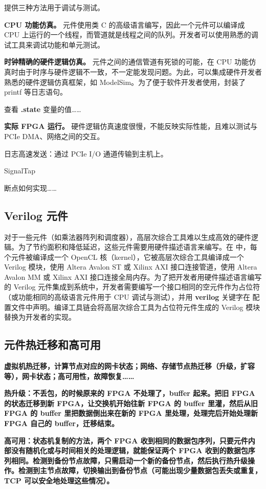 \name 提供三种方法用于调试与测试。

\textbf{CPU 功能仿真。}
\name 元件使用类 C 的高级语言编写，因此一个元件可以编译成 CPU 上运行的一个线程，而管道就是线程之间的队列。开发者可以使用熟悉的调试工具来调试功能和单元测试。

\textbf{时钟精确的硬件逻辑仿真。}
元件之间的通信管道有死锁的可能，在 CPU 功能仿真时由于时序与硬件逻辑不一致，不一定能发现问题。为此，\name 可以集成硬件开发者熟悉的硬件逻辑仿真框架，如 ModelSim。为了便于软件开发者使用，\name 封装了 printf 等日志语句。

查看 \textbf{.state} 变量的值……

\textbf{实际 FPGA 运行。}
硬件逻辑仿真速度很慢，不能反映实际性能，且难以测试与 PCIe DMA、网络之间的交互。

日志高速发送：通过 PCIe I/O 通道传输到主机上。

SignalTap

断点如何实现……

\subsection{Verilog 元件}

对于一些元件（如乘法器阵列和调度器），高层次综合工具难以生成高效的硬件逻辑。为了节约面积和降低延迟，这些元件需要用硬件描述语言来编写。在 \name 中，每个元件被编译成一个 OpenCL 核（kernel），它被高层次综合工具编译成一个 Verilog 模块，使用 Altera Avalon ST 或 Xilinx AXI 接口连接管道，使用 Altera Avalon MM 或 Xilinx AXI 接口连接全局内存。为了把开发者用硬件描述语言编写的 Verilog 元件集成到系统中，开发者需要编写一个接口相同的空元件作为占位符（或功能相同的高级语言元件用于 CPU 调试与测试），并用 \textbf{verilog} 关键字在 \name 配置文件中声明。编译工具链会将高层次综合工具为占位符元件生成的 Verilog 模块替换为开发者的实现。

\subsection{元件热迁移和高可用}

\textbf{虚拟机热迁移，计算节点对应的网卡状态；网络、存储节点热迁移（升级，扩容等），网卡状态；高可用性，故障恢复……}

\textbf{热升级：不丢包，的时候原来的 FPGA 不处理了，buffer 起来。把旧 FPGA 的状态迁移到新 FPGA，让交换机开始往新 FPGA 的 buffer 里灌，然后从旧 FPGA 的 buffer 里把数据倒出来在新的 FPGA 里处理，处理完后开始处理新 FPGA 自己的 buffer，迁移结束。}

\textbf{高可用：状态机复制的方法，两个 FPGA 收到相同的数据包序列，只要元件内部没有随机化或与时间相关的处理逻辑，就能保证两个 FPGA 收到的数据包序列相同。检测到备份节点故障，只需启动一个新的备份节点，然后执行热升级操作。检测到主节点故障，切换输出到备份节点（可能出现少量数据包丢失或重复，TCP 可以安全地处理这些情况）。}



